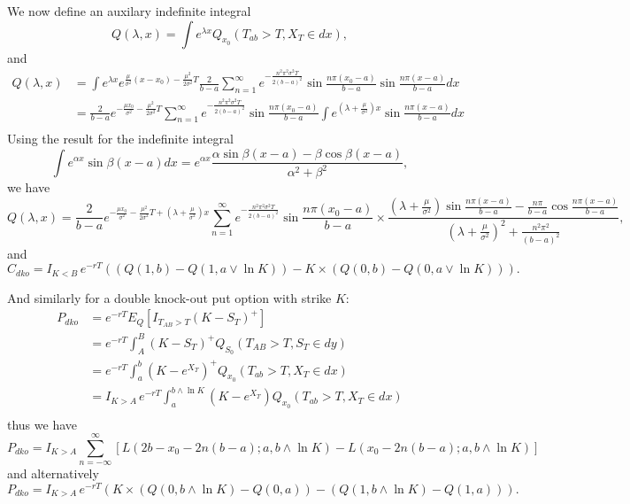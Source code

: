 We now define an auxilary indefinite integral
\begin{equation} \label{F:intQ}
  Q(\lambda,x) = \int e^{\lambda x} Q_{x_0}(T_{ab}>T, X_T\in dx),
\end{equation}
and
\begin{align*}
	Q(\lambda,x) 
	  &= \int e^{\lambda x} 
	          e^{\frac{\mu}{\sigma^2}(x-x_0) - \frac{\mu^2}{2 \sigma^2} T} \frac{2}{b-a}
			      \sum_{n=1}^{\infty} 
			        e^{- \frac{n^2 \pi^2 \sigma^2 T}{2(b-a)^2} }
			        \sin \frac{n\pi (x_0-a)}{b-a} \sin \frac{n\pi (x-a)}{b-a} 
			  dx \\
		&= \frac{2}{b-a} e^{-\frac{\mu x_0}{\sigma^2} - \frac{\mu^2}{2 \sigma^2} T} 
			 \sum_{n=1}^{\infty} e^{- \frac{n^2 \pi^2 \sigma^2 T}{2(b-a)^2} }
			   \sin \frac{n\pi (x_0-a)}{b-a} 
				 \int e^{\left( \lambda+\frac{\mu}{\sigma^2} \right) x}
				      \sin \frac{n\pi (x-a)}{b-a} dx  \\
\end{align*}
Using the result for the indefinite integral
\[
	\int e^{\alpha x} \sin\beta (x-a) dx 
	  = e^{\alpha x} 
		\frac{\alpha \sin\beta (x-a) - \beta \cos\beta (x-a)}{\alpha^2 + \beta^2},
\]
we have
\[
	  Q(\lambda,x) 
	= \frac{2}{b-a} 
	  e^{ - \frac{\mu x_0}{\sigma^2} - \frac{\mu^2}{2 \sigma^2} T
		    + (\lambda +\frac{\mu}{\sigma^2}) x
		  } 
	  \sum_{n=1}^{\infty} e^{- \frac{n^2 \pi^2 \sigma^2 T}{2(b-a)^2} }
			\sin \frac{n\pi (x_0-a)}{b-a}  \times
			\frac{
				     (\lambda + \frac{\mu}{\sigma^2}) \sin\frac{n\pi (x-a)}{b-a}
			        - \frac{n\pi}{b-a} \cos\frac{n\pi (x-a)}{b-a} 
					 }
			     { (\lambda+\frac{\mu}{\sigma^2})^2 + \frac{n^2 \pi^2}{(b-a)^2}
					 },
\]
and 
\begin{equation}
	C_{dko} = I_{K<B}\, e^{-rT} 
	  ( ( Q(1,b) - Q(1,a\vee \ln K) ) - K\times ( Q(0,b) - Q(0,a\vee \ln K) ) ).
\end{equation}

And similarly for a double knock-out put option with strike $K$:
\begin{align*}
  P_{dko} 
	&= e^{-rT} E_Q[I_{T_{AB}>T} (K-S_T)^+]   \\
	&= e^{-rT} \int_A^B (K-S_T)^+ Q_{S_0}(T_{AB}>T, S_T\in dy)  \\
	&= e^{-rT} \int_a^b (K- e^{X_T})^+ Q_{x_0}(T_{ab}>T, X_T\in dx)  \\
	&= I_{K>A}\, e^{-rT} \int_{a}^{b\wedge\ln K} (K- e^{X_T}) 
	   Q_{x_0}(T_{ab}>T, X_T\in dx) \\
\end{align*}
thus we have
\begin{equation}
  P_{dko}  = I_{K>A}
    \sum_{n=-\infty}^{\infty} 
    \left[
       L(2b-x_0-2n(b-a); a, b\wedge\ln K) - L(x_0-2n(b-a); a, b\wedge\ln K) 
    \right]    
\end{equation}
and alternatively
\begin{equation}
  P_{dko} = I_{K>A}\, e^{-rT} 
   (K\times (Q(0,b\wedge\ln K) - Q(0,a)) - (Q(1,b\wedge\ln K) - Q(1,a) )).
\end{equation}


